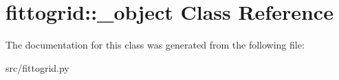 \hypertarget{classfittogrid_1_1__object}{
\section{fittogrid::\_\-object Class Reference}
\label{d4/dd1/classfittogrid_1_1__object}
}


The documentation for this class was generated from the following file:\begin{DoxyCompactItemize}
\item 
src/fittogrid.py\end{DoxyCompactItemize}
